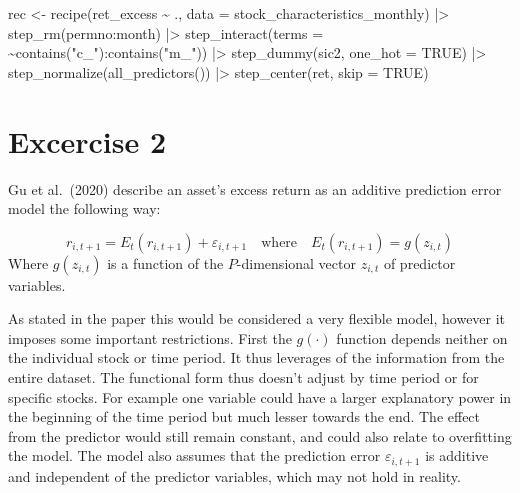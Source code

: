 \documentclass[
]{article}
\newenvironment{Shaded}{\begin{snugshade}}{\end{snugshade}}
\newcommand{\AttributeTok}[1]{\textcolor[rgb]{0.77,0.63,0.00}{#1}}
\newcommand{\ConstantTok}[1]{\textcolor[rgb]{0.00,0.00,0.00}{#1}}
\newcommand{\FunctionTok}[1]{\textcolor[rgb]{0.00,0.00,0.00}{#1}}
\newcommand{\NormalTok}[1]{#1}
\newcommand{\OtherTok}[1]{\textcolor[rgb]{0.56,0.35,0.01}{#1}}
\newcommand{\SpecialCharTok}[1]{\textcolor[rgb]{0.00,0.00,0.00}{#1}}
\newcommand{\StringTok}[1]{\textcolor[rgb]{0.31,0.60,0.02}{#1}}
\begin{document}
\begin{Shaded}
\begin{Highlighting}[]
\NormalTok{rec }\OtherTok{\textless{}{-}} \FunctionTok{recipe}\NormalTok{(ret\_excess }\SpecialCharTok{\textasciitilde{}}\NormalTok{ ., }\AttributeTok{data =}\NormalTok{ stock\_characteristics\_monthly) }\SpecialCharTok{|\textgreater{}}
  \FunctionTok{step\_rm}\NormalTok{(permno}\SpecialCharTok{:}\NormalTok{month) }\SpecialCharTok{|\textgreater{}}
  \FunctionTok{step\_interact}\NormalTok{(}\AttributeTok{terms =} \SpecialCharTok{\textasciitilde{}}\FunctionTok{contains}\NormalTok{(}\StringTok{"c\_"}\NormalTok{)}\SpecialCharTok{:}\FunctionTok{contains}\NormalTok{(}\StringTok{"m\_"}\NormalTok{)) }\SpecialCharTok{|\textgreater{}}
  \FunctionTok{step\_dummy}\NormalTok{(sic2, }\AttributeTok{one\_hot =} \ConstantTok{TRUE}\NormalTok{) }\SpecialCharTok{|\textgreater{}}
  \FunctionTok{step\_normalize}\NormalTok{(}\FunctionTok{all\_predictors}\NormalTok{()) }\SpecialCharTok{|\textgreater{}}
  \FunctionTok{step\_center}\NormalTok{(ret, }\AttributeTok{skip =} \ConstantTok{TRUE}\NormalTok{)}
\end{Highlighting}
\end{Shaded}

\hypertarget{excercise-2}{%
\section{Excercise 2}\label{excercise-2}}

Gu et al.~(2020) describe an asset's excess return as an additive
prediction error model the following way:

\[r_{i,t+1} = E_t(r_{i,t+1}) + \varepsilon_{i,t+1} \quad \text{where} \quad E_t(r_{i,t+1}) = g(z_{i,t})\]
Where \(g(z_{i,t})\) is a function of the \(P\)-dimensional vector
\(z_{i,t}\) of predictor variables.

As stated in the paper this would be considered a very flexible model,
however it imposes some important restrictions. First the \(g(\cdot)\)
function depends neither on the individual stock or time period. It thus
leverages of the information from the entire dataset. The functional
form thus doesn't adjust by time period or for specific stocks. For
example one variable could have a larger explanatory power in the
beginning of the time period but much lesser towards the end. The effect
from the predictor would still remain constant, and could also relate to
overfitting the model. The model also assumes that the prediction error
\(\varepsilon_{i,t+1}\) is additive and independent of the predictor
variables, which may not hold in reality.
\end{document}
